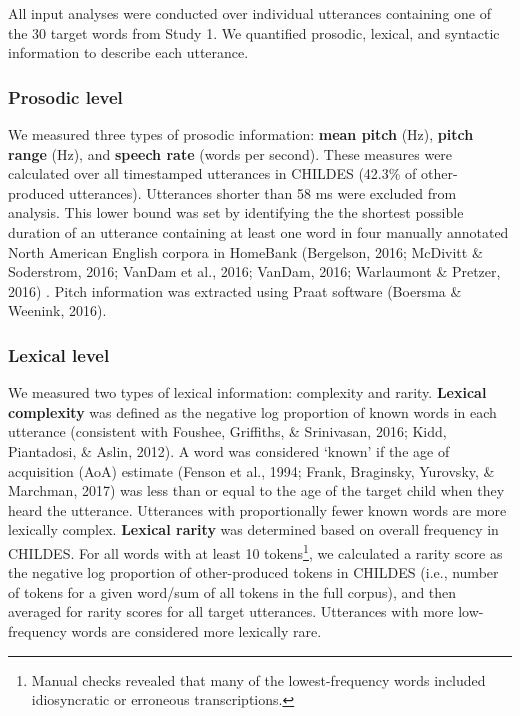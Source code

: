 \documentclass[10pt, letterpaper]{article}
\begin{document}
All input analyses were conducted over individual utterances containing
one of the 30 target words from Study 1. We quantified prosodic,
lexical, and syntactic information to describe each utterance.

\hypertarget{prosodic-level}{%
\subsubsection{Prosodic level}\label{prosodic-level}}

We measured three types of prosodic information: \textbf{mean pitch}
(Hz), \textbf{pitch range} (Hz), and \textbf{speech rate} (words per
second). These measures were calculated over all timestamped utterances
in CHILDES (42.3\% of other-produced utterances). Utterances shorter
than 58 ms were excluded from analysis. This lower bound was set by
identifying the the shortest possible duration of an utterance
containing at least one word in four manually annotated North American
English corpora in HomeBank (Bergelson, 2016; McDivitt \& Soderstrom,
2016; VanDam et al., 2016; VanDam, 2016; Warlaumont \& Pretzer, 2016) .
Pitch information was extracted using Praat software (Boersma \&
Weenink, 2016).

\hypertarget{lexical-level}{%
\subsubsection{Lexical level}\label{lexical-level}}

We measured two types of lexical information: complexity and rarity.
\textbf{Lexical complexity} was defined as the negative log proportion
of known words in each utterance (consistent with Foushee, Griffiths, \&
Srinivasan, 2016; Kidd, Piantadosi, \& Aslin, 2012). A word was
considered `known' if the age of acquisition (AoA) estimate (Fenson et
al., 1994; Frank, Braginsky, Yurovsky, \& Marchman, 2017) was less than
or equal to the age of the target child when they heard the utterance.
Utterances with proportionally fewer known words are more lexically
complex. \textbf{Lexical rarity} was determined based on overall
frequency in CHILDES. For all words with at least 10 tokens\footnote{Manual
  checks revealed that many of the lowest-frequency words included
  idiosyncratic or erroneous transcriptions.}, we calculated a rarity
score as the negative log proportion of other-produced tokens in CHILDES
(i.e., number of tokens for a given word/sum of all tokens in the full
corpus), and then averaged for rarity scores for all target utterances.
Utterances with more low-frequency words are considered more lexically
rare.
\end{document}
